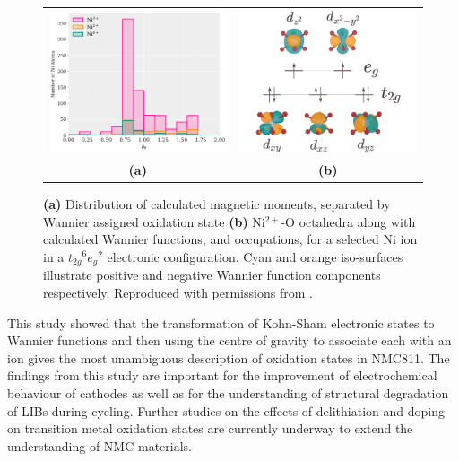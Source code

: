 \documentclass[journal=jacsat,manuscript=article]{achemso}
\begin{document}
\begin{figure}[tb]
  \begin{center}
  \centering
  \begin{tabular}{c c}
   \includegraphics[width=0.5\columnwidth]{Figures/mag_mom_hist.pdf}&\includegraphics[width=0.4\columnwidth]{Figures/wannier_centres_assigned.pdf}\\
  \textbf{(a)}&\textbf{(b)}\\
   \end{tabular}
    \caption{\label{fig:Mag} \textbf{(a)} Distribution of calculated magnetic moments, separated by Wannier assigned oxidation state \textbf{(b)} Ni$^{2+}$-O octahedra along with calculated Wannier functions, and occupations, for a selected Ni ion in a ${t_{2g}}^{6}{e_{g}}^{2}$ electronic configuration. Cyan and orange iso-surfaces illustrate positive and negative Wannier function components respectively. Reproduced with permissions from .}
    \end{center}
\end{figure}

This study  showed that the transformation of Kohn-Sham electronic states to Wannier functions and then using the centre of gravity to associate each with an ion gives the most unambiguous description of oxidation states in NMC811. The findings from this study are important for the improvement of electrochemical behaviour of cathodes as well as for the understanding of structural degradation of LIBs during cycling. Further studies on the effects of delithiation and doping on transition metal oxidation states are currently underway to extend the understanding of NMC materials.
\end{document}
